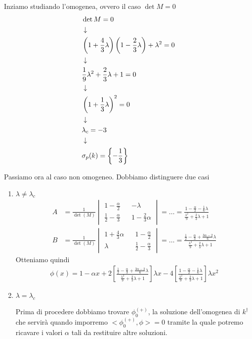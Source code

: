 Inziamo studiando l'omogenea, ovvero il caso $\det M=0$
\begin{align}
	&\det M = 0 \\ &\downarrow \nonumber \\
	&\left( 1+\frac{4}{3} \lambda \right) \left( 1-\frac{2}{3} \lambda \right) + \lambda^2 =0 \nonumber \\ &\downarrow \nonumber \\
	& \frac{1}{9} \lambda^2 + \frac{2}{3} \lambda +1 = 0\nonumber \\ &\downarrow \nonumber \\
	& \left( 1+\frac{1}{3} \lambda \right)^2 = 0 \nonumber \\ &\downarrow \nonumber \\
	& \lambda_c = -3 \nonumber \\ &\downarrow \nonumber \\
	&\sigma_p(k) = \left\{ -\frac{1}{3} \right\}
\end{align}

Passiamo ora al caso non omogeneo. Dobbiamo distinguere due casi
\begin{enumerate}
	\item  $\lambda \neq \lambda_c$
		\begin{align}
			A &= \frac{1}{\det (M)} \begin{vmatrix} 
	1 - \frac{\alpha}{2} && -\lambda \\
	\frac{1}{2} - \frac{\alpha}{3} && 1 - \frac{2}{3}\alpha		
	\end{vmatrix} = \dots = \frac{1 - \frac{\alpha}{2} - \frac{1}{6} \lambda}{\frac{\lambda^2}{9} + \frac{2}{3}\lambda + 1} \\
	B &= \frac{1}{\det (M)} \begin{vmatrix} 
	1 + \frac{4}{3}\alpha && 1 - \frac{\alpha}{2} \\
	\lambda && \frac{1}{2} - \frac{\alpha}{3}		
	\end{vmatrix} = \dots = \frac{\frac{1}{2} - \frac{\alpha}{3} + \frac{3\alpha -2}{6} \lambda}{\frac{\lambda^2}{9} + \frac{2}{3}\lambda + 1}	
	\end{align}
	Otteniamo quindi
	\begin{align}
		\phi(x) = 1 -\alpha x + 2 \left[ \frac{\frac{1}{2} - \frac{\alpha}{3} + \frac{3\alpha -2}{6} \lambda}{\frac{\lambda^2}{9} + \frac{2}{3}\lambda + 1} \right] \lambda x - 4 \left[ \frac{1 - \frac{\alpha}{2} - \frac{1}{6} \lambda}{\frac{\lambda^2}{9} + \frac{2}{3}\lambda + 1} \right] \lambda x^2
	\end{align}

	\item  $\lambda = \lambda_c$
	
	Prima di procedere dobbiamo trovare $\phi_0^{(+)}$, la soluzione dell'omogenea di $k^\dagger$ che servirà quando imporremo $<\phi_0^{(+)}, \phi> = 0$ tramite la quale potremo ricavare i valori $\alpha$ tali da restituire altre soluzioni. 
	

\end{enumerate}

